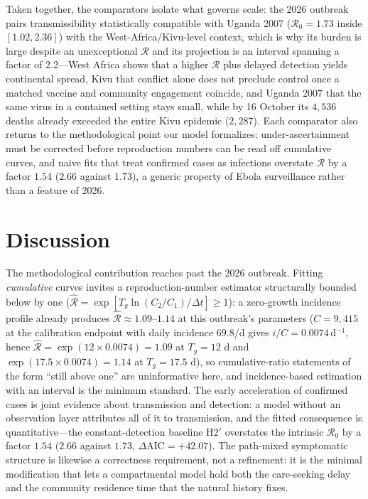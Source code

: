 \documentclass[10pt]{plos}
\newcommand{\Reff}{\mathcal{R}}
\begin{document}
Taken together, the comparators isolate what governs scale: the 2026
outbreak pairs transmissibility statistically compatible with Uganda
2007 ($\Reff_0=1.73$ inside $[1.02,2.36]$) with the
West-Africa/Kivu-level context, which is why its burden is large despite
an unexceptional $\Reff$ and its projection is an interval spanning a
factor of 2.2---West Africa shows that a higher $\Reff$ plus delayed
detection yields continental spread, Kivu that conflict alone does not
preclude control once a matched vaccine and community engagement
coincide, and Uganda 2007 that the same virus in a contained setting
stays small, while by 16 October its $4{,}536$ deaths already exceeded
the entire Kivu epidemic ($2{,}287$). Each comparator also returns to
the methodological point our model formalizes: under-ascertainment must
be corrected before reproduction numbers can be read off cumulative
curves, and naive fits that treat confirmed cases as infections
overstate $\Reff$ by a factor $1.54$ ($2.66$ against $1.73$), a generic
property of Ebola surveillance rather than a feature of 2026.
\section{Discussion}\label{sec:discussion}

The methodological contribution reaches past the 2026 outbreak. Fitting
\emph{cumulative} curves invites a reproduction-number estimator
structurally bounded below by one
($\hat{\Reff}=\exp[T_g\ln(C_2/C_1)/\Delta t]\ge1$): a zero-growth
incidence profile already produces $\hat{\Reff}\approx1.09$--$1.14$ at
this outbreak's parameters ($C=9{,}415$ at the calibration endpoint
with daily incidence $69.8$/d gives $i/C=0.0074\,$d$^{-1}$, hence
$\hat{\Reff}=\exp(12\times0.0074)=1.09$ at $T_g=12$ d and
$\exp(17.5\times0.0074)=1.14$ at $T_g=17.5$ d), so cumulative-ratio
statements of the form ``still above one'' are uninformative here, and
incidence-based estimation with an interval is the minimum standard.
The early acceleration of confirmed cases is joint evidence about
transmission and detection: a model without an observation layer
attributes all of it to transmission, and the fitted consequence is
quantitative---the constant-detection baseline H2$'$ overstates the
intrinsic $\Reff_0$ by a factor $1.54$ ($2.66$ against $1.73$,
$\Delta\mathrm{AIC}=+42.07$). The path-mixed symptomatic structure is
likewise a correctness requirement, not a refinement: it is the minimal
modification that lets a compartmental model hold both the care-seeking
delay and the community residence time that the natural history fixes.
\end{document}
